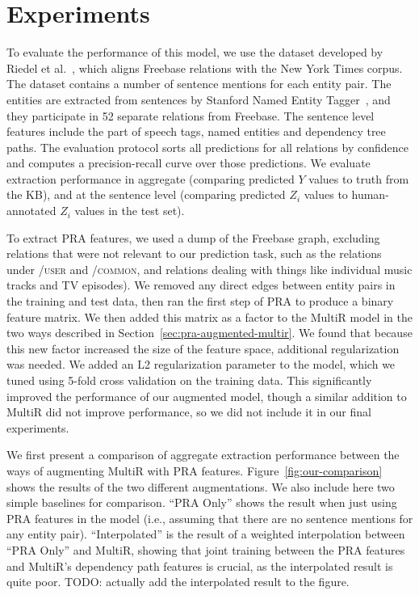 \documentclass[11pt,a4paper]{article}
\newcommand{\secref}[1]{Section~\ref{sec:#1}}
\newcommand{\figref}[1]{Figure~\ref{fig:#1}}
\newcommand{\relation}[1]{\textsc{#1}}
\begin{document}
\section{Experiments}

To evaluate the performance of this model, we use the dataset developed by
Riedel et al.~, which aligns
Freebase relations with the New York Times corpus.  The dataset contains a
number of sentence mentions for each entity pair. The entities are extracted
from sentences by Stanford Named Entity Tagger~\cite{finkel-2005-non-local-ie},
and they participate in 52 separate relations from Freebase.  The sentence
level features include the part of speech tags, named entities and dependency
tree paths.  The evaluation protocol sorts all predictions for all relations by
confidence and computes a precision-recall curve over those predictions.  We
evaluate extraction performance in aggregate (comparing predicted $Y$ values to
truth from the KB), and at the sentence level (comparing predicted $Z_i$ values
to human-annotated $Z_i$ values in the test set).

To extract PRA features, we used a dump of the Freebase graph, excluding
relations that were not relevant to our prediction task, such as the relations
under \relation{/user} and \relation{/common}, and relations dealing with
things like individual music tracks and TV episodes).  We removed any direct
edges between entity pairs in the training and test data, then ran the first
step of PRA to produce a binary feature matrix.  We then added this matrix as a
factor to the MultiR model in the two ways described in
\secref{pra-augmented-multir}.  We found that because this new factor increased
the size of the feature space, additional regularization was needed.  We added
an L2 regularization parameter to the model, which we tuned using 5-fold cross
validation on the training data.  This significantly improved the performance
of our augmented model, though a similar addition to MultiR did not improve
performance, so we did not include it in our final experiments.

We first present a comparison of aggregate extraction performance between the
ways of augmenting MultiR with PRA features.  \figref{our-comparison} shows the
results of the two different augmentations.  We also include here two simple
baselines for comparison.  ``PRA Only'' shows the result when just using PRA
features in the model (i.e., assuming that there are no sentence mentions for
any entity pair).  ``Interpolated'' is the result of a weighted
interpolation between ``PRA Only'' and MultiR, showing that joint training
between the PRA features and MultiR's dependency path features is crucial, as
the interpolated result is quite poor.  TODO: actually add the interpolated
result to the figure.
\end{document}
